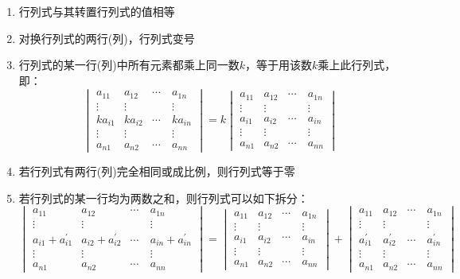 \documentclass[12pt,a4paper,UTF8]{book}
\begin{document}
\begin{enumerate}
\item 行列式与其转置行列式的值相等
\item 对换行列式的两行(列)，行列式变号
\item 行列式的某一行(列)中所有元素都乘上同一数$k$，等于用该数$k$乘上此行列式，即：
\[\begin{vmatrix}a_{11}&a_{12}&\cdots&a_{1n}\\\vdots&\vdots&\quad&\vdots\\ka_{i1}&ka_{i2}&\cdots&ka_{in}\\\vdots&\vdots&\quad&\vdots\\a_{n1}&a_{n2}&\cdots&a_{nn}\end{vmatrix}=k\begin{vmatrix}a_{11}&a_{12}&\cdots&a_{1n}\\\vdots&\vdots&\quad&\vdots\\a_{i1}&a_{i2}&\cdots&a_{in}\\\vdots&\vdots&\quad&\vdots\\a_{n1}&a_{n2}&\cdots&a_{nn}\end{vmatrix}\]
\item 若行列式有两行(列)完全相同或成比例，则行列式等于零
\item 若行列式的某一行均为两数之和，则行列式可以如下拆分：
\[\begin{vmatrix}a_{11}&a_{12}&\cdots&a_{1n}\\\vdots&\vdots&\quad&\vdots\\a_{i1}+a_{i1}^{\prime}&a_{i2}+a_{i2}^{\prime}&\cdots&a_{in}+a_{in}^{\prime}\\\vdots&\vdots&\quad&\vdots\\a_{n1}&a_{n2}&\cdots&a_{nn}\end{vmatrix}=\begin{vmatrix}a_{11}&a_{12}&\cdots&a_{1n}\\\vdots&\vdots&\quad&\vdots\\a_{i1}&a_{i2}&\cdots&a_{in}\\\vdots&\vdots&\quad&\vdots\\a_{n1}&a_{n2}&\cdots&a_{nn}\end{vmatrix}+\begin{vmatrix}a_{11}&a_{12}&\cdots&a_{1n}\\\vdots&\vdots&\quad&\vdots\\a_{i1}^{\prime}&a_{i2}^{\prime}&\cdots&a_{in}^{\prime}\\\vdots&\vdots&\quad&\vdots\\a_{n1}&a_{n2}&\cdots&a_{nn}\end{vmatrix}\]

\end{enumerate}
\end{document}
